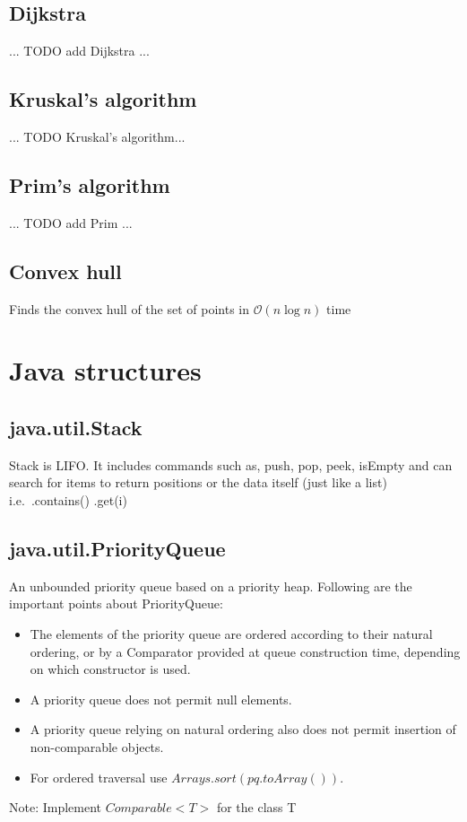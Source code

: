 \documentclass[a4paper]{article}
\begin{document}
\subsection{Dijkstra}
... TODO add Dijkstra ...


\subsection{Kruskal's algorithm}
... TODO Kruskal's algorithm...


\subsection{Prim's algorithm}
... TODO add Prim ...


\subsection{Convex hull}
Finds the convex hull of the set of points in $\mathcal{O}(n\log{}n)$ time

\section{Java structures}

\subsection{java.util.Stack}
Stack is LIFO. It includes commands such as, push, pop, peek, isEmpty and can search for items to return positions or the data itself (just like a list) i.e.\ .contains() .get(i)

\subsection{java.util.PriorityQueue}
An unbounded priority queue based on a priority heap. Following are the important points about PriorityQueue:
\begin{itemize}
  \item The elements of the priority queue are ordered according to their natural ordering, or by a Comparator provided at queue construction time, depending on which constructor is used.
  \item A priority queue does not permit null elements.
  \item A priority queue relying on natural ordering also does not permit insertion of non-comparable objects.
  \item For ordered traversal use \textit{$Arrays.sort(pq.toArray())$}.
\end{itemize}
Note: Implement \textit{$Comparable<T>$} for the class T
\end{document}
